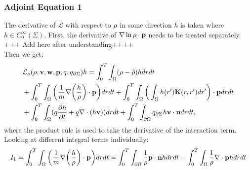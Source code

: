 \subsubsection{Adjoint Equation 1}

The derivative of $\mathcal{L}$ with respect to $\rho$ in some direction $h$ is taken where ${h} \in C_0^\infty(\Sigma) $.
First, the derivative of $\nabla \ln \rho \cdot \mathbf{p}$ needs to be treated separately.
+++ Add here after understanding++++\\
Then we get:
\begin{align*}
&\mathcal{L}_\rho(\rho,\mathbf{v},\mathbf{w},\mathbf{p},q,{q}_{\partial \Sigma})h = \int_0^T \int_\Omega  (\rho - \hat {\rho})h drdt \\
&+ \int_0^T \int_\Omega \bigg( \frac{1}{m}\nabla \bigg(\frac{h}{\rho}\bigg)\cdot \mathbf{p}\bigg)  dr dt + \int_0^T \int_\Omega \bigg(\int_\Omega h(r') \mathbf{K}(r,r') dr'\bigg) \cdot \mathbf{p} dr dt\\
& + \int_0^T \int_\Omega (q\frac{\partial h}{\partial t} + q\nabla \cdot (h \mathbf{v}))  dr dt +\int_0^T \int_{\partial\Omega} {q}_{\partial \Sigma} h\mathbf{v} \cdot \mathbf{n}  dr dt,
\end{align*}
where the product rule is used to take the derivative of the interaction term.
Looking at different integral terms individually:
\begin{align*}
I_1= \int_0^T \int_\Omega \bigg( \frac{1}{m}\nabla \bigg(\frac{h}{\rho}\bigg)\cdot \mathbf{p}\bigg) dr dt = \int_0^T \int_{\partial \Omega} \frac{1}{\rho} \mathbf{p} \cdot \mathbf{n} h dr dt - \int_0^T \int_{\Omega} \frac{1}{\rho} \nabla\cdot \mathbf{p} h dr dt
\end{align*}
 
